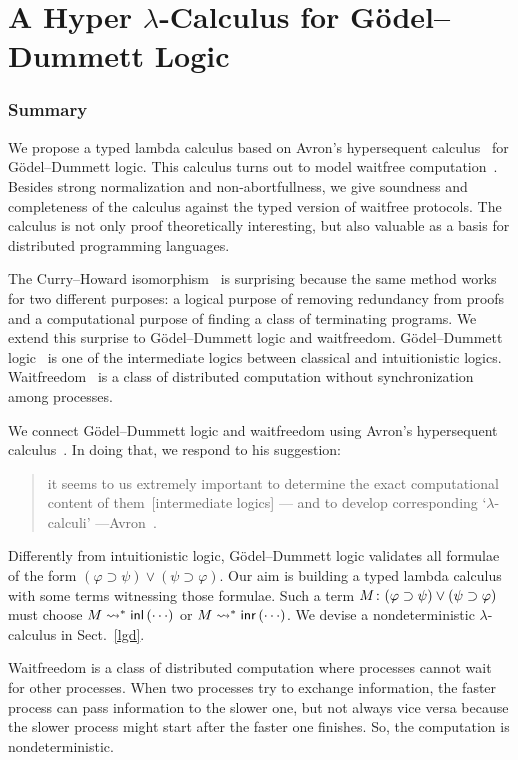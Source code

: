 \chapter{A Hyper $\lambda$-Calculus for G\"odel--Dummett Logic}
\label{ch:lambda}

\subsection{Summary}

We propose a typed lambda calculus based on Avron's hypersequent
calculus~\citep{avron91} for G\"odel--Dummett logic.  This calculus turns out to model
waitfree computation~\citep{Herlihy88,Saks:1993vq}.
Besides strong normalization and non-abortfullness,
we give soundness and completeness of
the calculus against the typed version of waitfree protocols.
The calculus is not only proof theoretically interesting,
but also valuable as a basis for distributed programming languages.

The Curry--Howard isomorphism~\cite{curryhoward} is surprising because the same
method works for two different purposes: a logical purpose of
removing redundancy from proofs and a computational purpose of finding a
class of terminating programs.
We extend
this surprise to G\"odel--Dummett logic and
waitfreedom.
G\"odel--Dummett logic~\cite{dummett59}
is one of the intermediate logics
between classical and intuitionistic logics.
Waitfreedom~\cite{Herlihy88,Saks:1993vq} is a class of distributed
computation without synchronization among processes.

We connect G\"odel--Dummett logic and waitfreedom using
Avron's hypersequent calculus~\cite{avron91}.
In doing that, we respond to his suggestion:
\begin{quote}
it seems to us extremely important to determine the exact
       computational content of them~[intermediate logics] ---
       and {to develop corresponding `$\lambda$-calculi'}
       ---Avron~\cite{avron91}.
\end{quote}
Differently from intuitionistic logic, G\"odel--Dummett logic validates
all formulae of the form
 $(\varphi\supset\psi)\vee(\psi\supset\varphi)$.
Our aim is building a typed lambda calculus
with some terms witnessing those formulae.
Such a term
${M} \colon{(\varphi\supset\psi)\vee(\psi\supset\varphi)}$ must choose
$M\rightsquigarrow^\ast \mathsf{inl}\left({\cdots}\right)$ or $M\rightsquigarrow^\ast \mathsf{inr}\left({\cdots}\right)$.
We devise a nondeterministic $\lambda$-calculus in Sect.~\ref{lgd}.

Waitfreedom is a class of distributed computation where
processes cannot wait for other processes.  When two processes try to
exchange information, the faster process can pass information to the
slower one, but not always vice versa because the slower process might
start after the faster one finishes.
So, the computation is nondeterministic.

